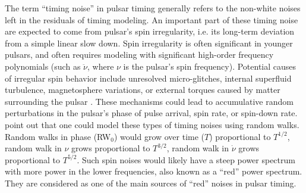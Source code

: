 The term ``timing noise'' in pulsar timing generally refers to the non-white
noises left in the residuals of timing modeling.
An important part of these timing noise are expected to come from pulsar's spin
irregularity, i.e. its long-term deviation from a simple linear slow down. 
Spin irregularity is often significant in younger pulsars, and often
requires modeling with significant high-order frequency polynomials (such as $\ddot{\nu}$, where $\nu$ is the pulsar's spin frequency). 
Potential causes of irregular spin behavior include unresolved
micro-glitches, internal superfluid turbulence, magnetosphere variations, or external torques caused by matter surrounding the pulsar \citep{hlk10, ymh+13, ml14}.
{\bfref These mechanisms could lead to accumulative random perturbations in the 
pulsar's phase of pulse arrival, spin rate, or spin-down rate. 
\citet{sc10} point out that one could model these types of timing noises using random walks.
Random walks in phase (RW$_0$) would grow over time ($T$) proportional to
$T^{1/2}$, random walk in $\nu$ grows proportional to $T^{3/2}$, random walk in
$\dot{\nu}$ grows proportional to $T^{5/2}$.
Such spin noises would likely have a steep power spectrum with more power in
the lower frequencies, also known as a ``red'' power spectrum. They
are considered as one of the main sources of ``red'' noises in pulsar timing.
}

